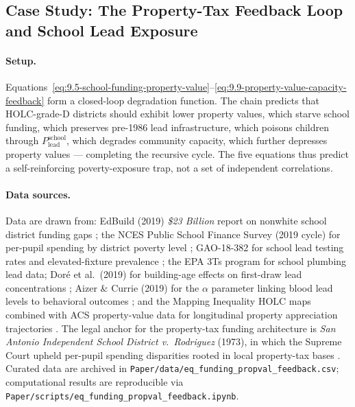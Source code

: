 \FloatBarrier

\subsection*{Case Study: The Property-Tax Feedback Loop and School Lead Exposure}
\label{cs:property_tax_feedback}

\paragraph{Setup.}
Equations~\ref{eq:9.5-school-funding-property-value}--\ref{eq:9.9-property-value-capacity-feedback} form a closed-loop degradation function. The chain predicts that HOLC-grade-D districts should exhibit lower property values, which starve school funding, which preserves pre-1986 lead infrastructure, which poisons children through $P_{\text{lead}}^{\text{school}}$, which degrades community capacity, which further depresses property values --- completing the recursive cycle. The five equations thus predict a self-reinforcing poverty-exposure trap, not a set of independent correlations.

\paragraph{Data sources.}
Data are drawn from: EdBuild (2019) \textit{\$23 Billion} report on nonwhite school district funding gaps \cite{edbuild_23b}; the NCES Public School Finance Survey (2019 cycle) for per-pupil spending by district poverty level \cite{tel_nces}; GAO-18-382 for school lead testing rates and elevated-fixture prevalence \cite{tel_gao}; the EPA 3Ts program for school plumbing lead data; Dor\'{e} et al.\ (2019) for building-age effects on first-draw lead concentrations \cite{tel_dore}; Aizer \& Currie (2019) for the $\alpha$ parameter linking blood lead levels to behavioral outcomes \cite{aizer_currie}; and the Mapping Inequality HOLC maps combined with ACS property-value data for longitudinal property appreciation trajectories \cite{mapping_inequality}. The legal anchor for the property-tax funding architecture is \textit{San Antonio Independent School District v.\ Rodriguez} (1973), in which the Supreme Court upheld per-pupil spending disparities rooted in local property-tax bases \cite{san_antonio_v_rodriguez}. Curated data are archived in \texttt{Paper/data/eq\_funding\_propval\_feedback.csv}; computational results are reproducible via \texttt{Paper/scripts/eq\_funding\_propval\_feedback.ipynb}.


